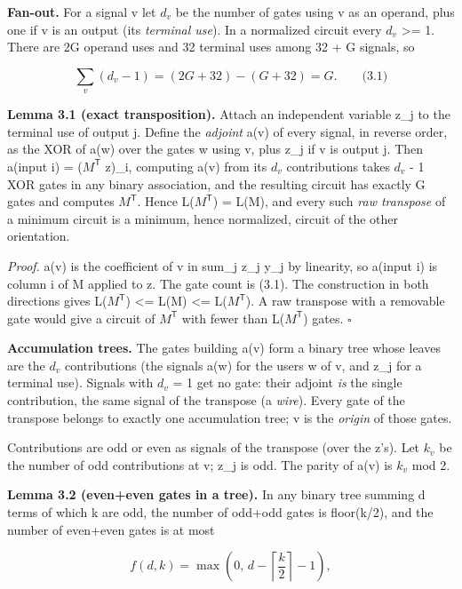 \textbf{Fan-out.} For a signal v let \(d_v\) be the number of gates using v as an operand, plus one if v is an output (its \emph{terminal use}). In a normalized circuit every \(d_v\) \textgreater= 1. There are 2G operand uses and 32 terminal uses among 32 + G signals, so

\[
\sum_v(d_v-1)=(2G+32)-(G+32)=G.\qquad\text{(3.1)}
\]

\textbf{Lemma 3.1 (exact transposition).} Attach an independent variable z\_j to the terminal use of output j. Define the \emph{adjoint} a(v) of every signal, in reverse order, as the XOR of a(w) over the gates w using v, plus z\_j if v is output j. Then a(input i) = (\(M^{\mathsf T}\) z)\_i, computing a(v) from its \(d_v\) contributions takes \(d_v\) - 1 XOR gates in any binary association, and the resulting circuit has exactly G gates and computes \(M^{\mathsf T}\). Hence L(\(M^{\mathsf T}\)) = L(M), and every such \emph{raw transpose} of a minimum circuit is a minimum, hence normalized, circuit of the other orientation.

\emph{Proof.} a(v) is the coefficient of v in sum\_j z\_j y\_j by linearity, so a(input i) is column i of M applied to z. The gate count is (3.1). The construction in both directions gives L(\(M^{\mathsf T}\)) \textless= L(M) \textless= L(\(M^{\mathsf T}\)). A raw transpose with a removable gate would give a circuit of \(M^{\mathsf T}\) with fewer than L(\(M^{\mathsf T}\)) gates. \(\square\)

\textbf{Accumulation trees.} The gates building a(v) form a binary tree whose leaves are the \(d_v\) contributions (the signals a(w) for the users w of v, and z\_j for a terminal use). Signals with \(d_v\) = 1 get no gate: their adjoint \emph{is} the single contribution, the same signal of the transpose (a \emph{wire}). Every gate of the transpose belongs to exactly one accumulation tree; v is the \emph{origin} of those gates.

Contributions are odd or even as signals of the transpose (over the z's). Let \(k_v\) be the number of odd contributions at v; z\_j is odd. The parity of a(v) is \(k_v\) mod 2.

\textbf{Lemma 3.2 (even+even gates in a tree).} In any binary tree summing d terms of which k are odd, the number of odd+odd gates is floor(k/2), and the number of even+even gates is at most

\[
f(d,k)=\max\!\left(0,\,d-\left\lceil\frac{k}{2}\right\rceil-1\right),
\]

